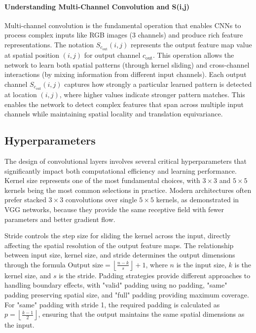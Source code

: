 \paragraph{Understanding Multi-Channel Convolution and S(i,j)}
Multi-channel convolution is the fundamental operation that enables CNNs to process complex inputs like RGB images (3 channels) and produce rich feature representations. The notation $S_{c_{\text{out}}}(i,j)$ represents the output feature map value at spatial position $(i,j)$ for output channel $c_{\text{out}}$. This operation allows the network to learn both spatial patterns (through kernel sliding) and cross-channel interactions (by mixing information from different input channels). Each output channel $S_{c_{\text{out}}}(i,j)$ captures how strongly a particular learned pattern is detected at location $(i,j)$, where higher values indicate stronger pattern matches. This enables the network to detect complex features that span across multiple input channels while maintaining spatial locality and translation equivariance.

\subsection{Hyperparameters}

The design of convolutional layers involves several critical hyperparameters that significantly impact both computational efficiency and learning performance. Kernel size represents one of the most fundamental choices, with $3 \times 3$ and $5 \times 5$ kernels being the most common selections in practice. Modern architectures often prefer stacked $3\times3$ convolutions over single $5\times5$ kernels, as demonstrated in VGG networks, because they provide the same receptive field with fewer parameters and better gradient flow.\cite{GoodfellowEtAl2016}

Stride controls the step size for sliding the kernel across the input, directly affecting the spatial resolution of the output feature maps. The relationship between input size, kernel size, and stride determines the output dimensions through the formula $\text{Output size} = \left\lfloor \frac{n - k}{s} \right\rfloor + 1$, where $n$ is the input size, $k$ is the kernel size, and $s$ is the stride. Padding strategies provide different approaches to handling boundary effects, with "valid" padding using no padding, "same" padding preserving spatial size, and "full" padding providing maximum coverage. For "same" padding with stride 1, the required padding is calculated as $p = \left\lfloor \frac{k-1}{2} \right\rfloor$, ensuring that the output maintains the same spatial dimensions as the input.

